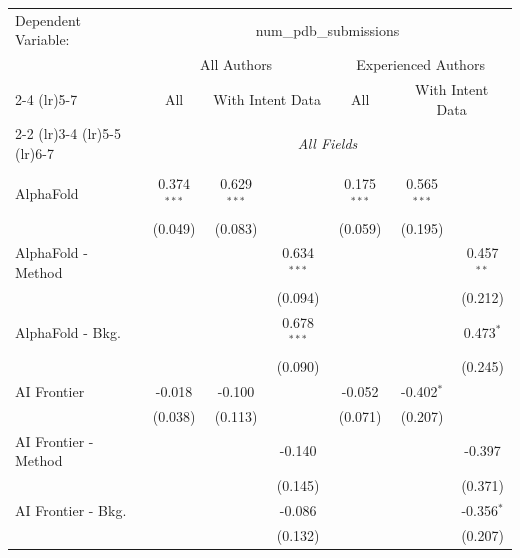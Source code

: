 \begingroup
\centering
\begin{tabular}{lcccccc}
   \tabularnewline \midrule \midrule
   Dependent Variable: & \multicolumn{6}{c}{num\_pdb\_submissions}\\
 & \multicolumn{3}{c}{All Authors} & \multicolumn{3}{c}{Experienced Authors} \\
\cmidrule(lr){2-4} \cmidrule(lr){5-7}
 & \multicolumn{1}{c}{All} & \multicolumn{2}{c}{With Intent Data} & \multicolumn{1}{c}{All} & \multicolumn{2}{c}{With Intent Data} \\
\cmidrule(lr){2-2} \cmidrule(lr){3-4} \cmidrule(lr){5-5} \cmidrule(lr){6-7}
 & \multicolumn{6}{c}{\textit{All Fields}} \\ \\
   AlphaFold            & 0.374$^{***}$  & 0.629$^{***}$ &               & 0.175$^{***}$ & 0.565$^{***}$ &   \\   
                        & (0.049)        & (0.083)       &               & (0.059)       & (0.195)       &   \\   
   AlphaFold - Method   &                &               & 0.634$^{***}$ &               &               & 0.457$^{**}$\\   
                        &                &               & (0.094)       &               &               & (0.212)\\   
   AlphaFold - Bkg.     &                &               & 0.678$^{***}$ &               &               & 0.473$^{*}$\\   
                        &                &               & (0.090)       &               &               & (0.245)\\   
   AI Frontier          & -0.018         & -0.100        &               & -0.052        & -0.402$^{*}$  &   \\   
                        & (0.038)        & (0.113)       &               & (0.071)       & (0.207)       &   \\   
   AI Frontier - Method &                &               & -0.140        &               &               & -0.397\\   
                        &                &               & (0.145)       &               &               & (0.371)\\   
   AI Frontier - Bkg.   &                &               & -0.086        &               &               & -0.356$^{*}$\\   
                        &                &               & (0.132)       &               &               & (0.207)\\   

\end{tabular}
